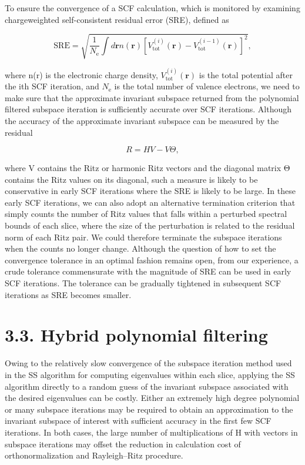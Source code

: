 \documentclass[
  10
]{article}
\begin{document}
To ensure the convergence of a SCF calculation, which is monitored by
examining chargeweighted self-consistent residual error (SRE), defined
as

\[
\mathrm{SRE} = \sqrt {\frac {1}{N _ {\mathrm{e}}} \int d \mathbf {r} n (\mathbf {r}) [ V _ {\mathrm{tot}} ^ {(i)} (\mathbf {r}) - V _ {\mathrm{tot}} ^ {(i - 1)} (\mathbf {r}) ] ^ {2}}, \tag {15}
\]

where n(r) is the electronic charge density,
\(V _ { \mathrm { t o t } } ^ { ( i ) } ( \mathbf { r } )\) is the total
potential after the ith SCF iteration, and \(N _ { \mathrm { e } }\) is
the total number of valence electrons, we need to make sure that the
approximate invariant subspace returned from the polynomial filtered
subspace iteration is sufficiently accurate over SCF iterations.
Although the accuracy of the approximate invariant subspace can be
measured by the residual

\[
R = H V - V \Theta ,
\]

where V contains the Ritz or harmonic Ritz vectors and the diagonal
matrix Θ contains the Ritz values on its diagonal, such a measure is
likely to be conservative in early SCF iterations where the SRE is
likely to be large. In these early SCF iterations, we can also adopt an
alternative termination criterion that simply counts the number of Ritz
values that falls within a perturbed spectral bounds of each slice,
where the size of the perturbation is related to the residual norm of
each Ritz pair. We could therefore terminate the subspace iterations
when the counts no longer change. Although the question of how to set
the convergence tolerance in an optimal fashion remains open, from our
experience, a crude tolerance commensurate with the magnitude of SRE can
be used in early SCF iterations. The tolerance can be gradually
tightened in subsequent SCF iterations as SRE becomes smaller.

\section{3.3. Hybrid polynomial
filtering}\label{hybrid-polynomial-filtering}

Owing to the relatively slow convergence of the subspace iteration
method used in the SS algorithm for computing eigenvalues within each
slice, applying the SS algorithm directly to a random guess of the
invariant subspace associated with the desired eigenvalues can be
costly. Either an extremely high degree polynomial or many subspace
iterations may be required to obtain an approximation to the invariant
subspace of interest with sufficient accuracy in the first few SCF
iterations. In both cases, the large number of multiplications of H with
vectors in subspace iterations may offset the reduction in calculation
cost of orthonormalization and Rayleigh--Ritz procedure.
\end{document}
